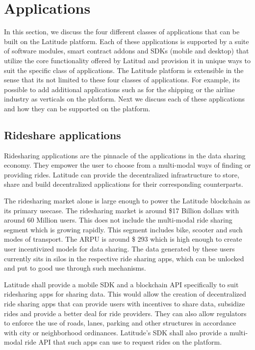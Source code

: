\section{Applications}
\label{sec:apps}

In this section, we discuss the four different classes of applications that can be built on the Latitude platform. Each
of these applications is supported by a suite of software modules, smart contract addons and SDKs (mobile and desktop)
that utilize the core functionality offered by Latitud and provision it in unique ways to suit the specific class of
applications. The Latitude platform is extensible in the sense that its not limited to these four classes of
applications. For example, its possible to add additional applications such as for the shipping or the airline industry
as verticals on the platform. Next we discuss each of these applications and how they can be supported on the platform.

\subsection{Rideshare applications}

Ridesharing applications are the pinnacle of the applications in the data sharing economy. They empower the user to
choose from a multi-modal ways of finding or providing rides. Latitude can provide the decentralized infrastructure to
store, share and build decentralized applications for their corresponding counterparts.

The ridesharing market alone is large enough to power the Latitude blockchain as its primary usecase. The ridesharing
market is around \$17 Billion dollars with around 60 Million users. This does not include the multi-modal ride sharing
segment which is growing rapidly. This segment includes bike, scooter and such modes of transport. The ARPU is around \$
293 which is high enough to create user incentivized models for data sharing. The data generated by these users
currently sits in silos in the respective ride sharing apps, which can be unlocked and put to good use through such
mechanisms. 

Latitude shall provide a mobile SDK and a blockchain API specifically to suit ridesharing apps for sharing data. This
would allow the creation of decentralized ride sharing apps that can provide users with incentives to share data,
subsidize rides and provide a better deal for ride providers. They can also allow regulators to enforce the use of
roads, lanes, parking and other structures in accordance with city or neighborhood ordinances. Latitude's SDK shall also
provide a multi-modal ride API that such apps can use to request rides on the platform.


